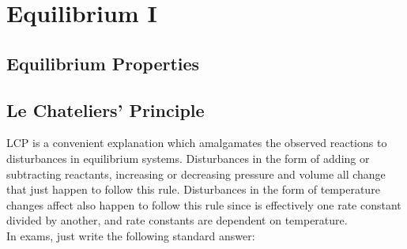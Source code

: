 \documentclass[../main]{subfiles}
\begin{document}
\section{Equilibrium I}

\subsection{Equilibrium Properties}

\subsection{Le Chateliers' Principle}


LCP is a convenient explanation which amalgamates the observed reactions to disturbances in equilibrium systems. Disturbances in the form of adding or subtracting reactants, increasing or decreasing pressure and volume all change  that just happen to follow this rule. Disturbances in the form of temperature changes affect  also happen to follow this rule since  is effectively one rate constant divided by another, and rate constants are dependent on temperature. \\

In exams, just write the following standard answer: \\
\end{document}
